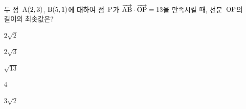 두 점~$\mathrm{A}(2{,}\mkern3mu\mathopen{}3)$, $\mathrm{B}(5{,}\mkern3mu\mathopen{}1)$에 대하여 점~$\mathrm{P}$가 $\overrightarrow{\mathrm{AB}}\cdot\overrightarrow{\mathrm{OP}}=13$을 만족시킬 때, 선분~$\mathrm{OP}$의 길이의 최솟값은? 
\begin{choices32}{\rule[-3ex]{0pt}{8ex}$2\sqrt{2}$}{\rule[-3ex]{0pt}{8ex}$2\sqrt{3}$}{\rule[-3ex]{0pt}{8ex}$\sqrt{13}$}{\rule[-3ex]{0pt}{8ex}$4$}{\rule[-3ex]{0pt}{8ex}$3\sqrt{2}$}\end{choices32}
